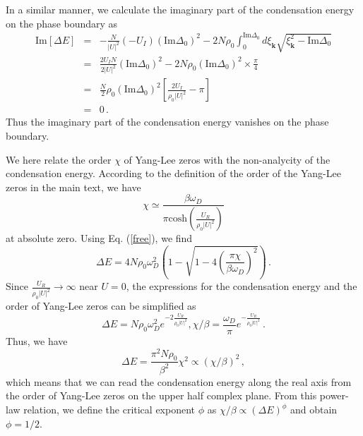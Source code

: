 \documentclass[aps,prl,twocolumn,nofootinbib,superscriptaddress,longbibliography]{revtex4-1}
\begin{document}
In a similar manner, we calculate the imaginary part of the condensation energy on the phase boundary as
\begin{eqnarray}
  \text{Im} [\Delta E] & = & - \frac{N}{| U |^2} \left( - U_I \right)
  \left( \text{Im} \Delta_0 \right)^2 - 2 N \rho_0 \int_0^{\text{Im} \Delta_0}
  d \xi_{\bm{k}} \sqrt{\xi_{\bm{k}}^2 - \text{Im} \Delta_0} \nonumber\\
  & = & \frac{2U_I N}{2 | U |^2} \left( \text{Im} \Delta_0 \right)^2 - 2 N
  \rho_0 \left( \text{Im} \Delta_0 \right)^2 \times \frac{\pi}{4} \nonumber\\
  & = & \frac{N}{2} \rho_0 \left( \text{Im} \Delta_0 \right)^2 \left[
  \frac{2U_I}{\rho_0 | U |^2} - \pi \right] \nonumber\\
  & = & 0 \,.
\end{eqnarray}
Thus the imaginary part of the condensation energy vanishes on the phase boundary. 

We here relate the order $\chi$ of Yang-Lee zeros with the non-analycity of the condensation energy. According to the definition of the order of the Yang-Lee zeros in the main text, we have
\begin{equation}
    \chi\simeq\frac{\beta\omega_D}{\pi\text{cosh}(\frac{U_R}{\rho_0|U|^2})}
\end{equation}
at absolute zero. Using Eq. (\ref{free}), we find
\begin{equation}
    \Delta E=4N\rho_0\omega_D^2(1-\sqrt{1-4(\frac{\pi\chi}{\beta\omega_D})^2})\,.
\end{equation}
Since $\frac{U_R}{\rho_0|U|^2}\rightarrow\infty$ near $U=0$, the expressions for the condensation energy and the order of Yang-Lee zeros can be simplified as
\begin{equation}
    \Delta E=N \rho_0 \omega_D^2 e^{-2\frac{U_R}{\rho_0|U|^2}},\chi/\beta=\frac{\omega_D}{\pi}e^{-\frac{U_R}{\rho_0|U|^2}}\,.
\end{equation}
Thus, we have
\begin{equation}
    \Delta E=\frac{\pi^2N\rho_0}{\beta^2}\chi^2\propto(\chi/\beta)^2\,,
\end{equation}
which means that we can read the condensation energy along the real axis from the order of Yang-Lee zeros on the upper half complex plane. From this power-law relation, we define the critical exponent $\phi$ as $\chi/\beta\propto(\Delta E)^{\phi}$ and obtain $\phi=1/2$.
\end{document}
